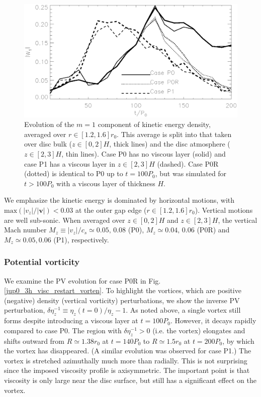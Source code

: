 \begin{figure}
  \centering
  \includegraphics[width=\linewidth]{figures/pdisk_kerz_cases_planet_m1}
  \caption{Evolution of the $m=1$ component of kinetic energy density,
    averaged over $r\in[1.2,1.6]r_0$. This average
    is split into that taken over disc bulk ($z\in[0,2]H$, thick
    lines) and the disc atmosphere ($z\in[2,3]H$, thin lines). Case P0
    has no viscous layer (solid) and case P1 has a viscous layer in
    $z\in[2,3]H$ (dashed). Case P0R (dotted) is identical to P0 up to $t=100P_0$,
    but was simulated for $t>100P_0$ with a viscous layer of thickness
    $H$.  
\label{pdisk_kerz_cases_planet}}
\end{figure}

We emphasize the kinetic energy is dominated by horizontal
motions, with $\mathrm{max}(|v_z|/|\bm{v}|) < 0.03$ at the outer
gap edge ($r\in[1.2,1.6]r_0$). Vertical motions are well sub-sonic. When averaged
over $z\in[0,2]H$ and $z\in[2,3]H$, the vertical Mach number
$M_z\equiv|v_z|/c_s \simeq 0.05,\,0.08$ (P0), $M_z\simeq 0.04,\,0.06$ (P0R) and
$M_z \simeq 0.05,0.06$ (P1), respectively. %


\subsubsection{Potential vorticity}
We examine the PV evolution for case P0R in
Fig. \ref{jup0_3h_visc_restart_vorten}.  
To highlight the vortices, which are positive (negative)
density (vertical vorticity) perturbations, we show the inverse PV
perturbation, $\delta\eta_z^{-1}\equiv\eta_z(t=0)/\eta_z - 1$. As
noted above, a single vortex still forms  
despite introducing a viscous layer at $t=100P_0$. However, it
decays rapidly compared to case P0. %
The region with $\delta\eta_z^{-1}>0$ (i.e. the vortex) elongates and 
shifts outward from $R\simeq 1.38r_0$ at $t=140P_0$ to $R\simeq1.5r_0$
at $t=200P_0$, by which the vortex has disappeared. (A similar
evolution was observed for case P1.) The vortex is stretched
azimuthally much more than radially. This is not surprising since the
imposed viscosity profile is axisymmetric. The important point is
that viscosity is only large near the disc surface, but still has a
significant effect on the vortex. 


